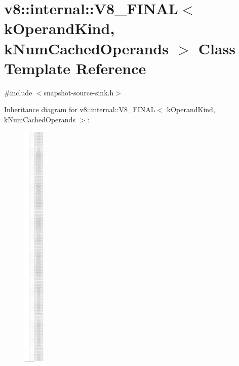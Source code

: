 \hypertarget{classv8_1_1internal_1_1_v8___f_i_n_a_l}{}\section{v8\+:\+:internal\+:\+:V8\+\_\+\+F\+I\+N\+A\+L$<$ k\+Operand\+Kind, k\+Num\+Cached\+Operands $>$ Class Template Reference}
\label{classv8_1_1internal_1_1_v8___f_i_n_a_l}


{\ttfamily \#include $<$snapshot-\/source-\/sink.\+h$>$}

Inheritance diagram for v8\+:\+:internal\+:\+:V8\+\_\+\+F\+I\+N\+A\+L$<$ k\+Operand\+Kind, k\+Num\+Cached\+Operands $>$\+:\begin{figure}[H]
\begin{center}
\leavevmode
\includegraphics[height=12.000000cm]{classv8_1_1internal_1_1_v8___f_i_n_a_l}
\end{center}
\end{figure}
